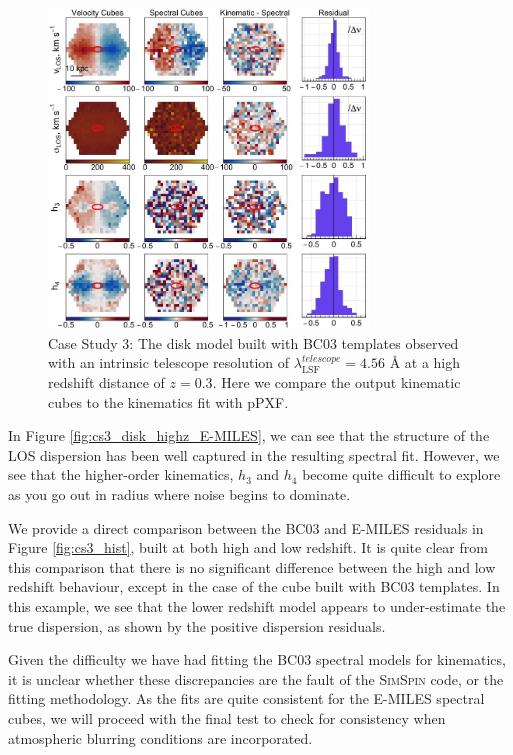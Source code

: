 \documentclass[
  journal=pasa,
  manuscript=research-paper, %
  year=2020,
  volume=37,
]{cup-journal}
\newcommand{\simspin}[1]{\textsc{SimSpin}#1} %
\begin{document}
\begin{figure}
    \centering
    \includegraphics[keepaspectratio, width=8.5cm]{cs3_disk_velocities_highz_fwhm_BC03.jpeg}
    \caption{Case Study 3: The disk model built with BC03 templates observed with an intrinsic telescope resolution of  $\lambda_{\text{LSF}}^{telescope} = 4.56$ \AA{} at a high redshift distance of $z = 0.3$. Here we compare the output kinematic cubes to the kinematics fit with pPXF.}
    \label{fig:cs3_disk_highz_BC03}
\end{figure}

In Figure \ref{fig:cs3_disk_highz_E-MILES}, we can see that the structure of the LOS dispersion has been well captured in the resulting spectral fit. 
However, we see that the higher-order kinematics, $h_3$ and $h_4$ become quite difficult to explore as you go out in radius where noise begins to dominate.

We provide a direct comparison between the \textsc{BC03} and E-MILES residuals in Figure \ref{fig:cs3_hist}, built at both high and low redshift.
It is quite clear from this comparison that there is no significant difference between the high and low redshift behaviour, except in the case of the cube built with \textsc{BC03} templates.
In this example, we see that the lower redshift model appears to under-estimate the true dispersion, as shown by the positive dispersion residuals. 

Given the difficulty we have had fitting the BC03 spectral models for kinematics, it is unclear whether these discrepancies are the fault of the \simspin{} code, or the fitting methodology. 
As the fits are quite consistent for the E-MILES spectral cubes, we will proceed with the final test to check for consistency when atmospheric blurring conditions are incorporated. 
\end{document}
